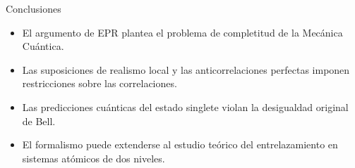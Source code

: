 \begin{frame}{Conclusiones}{}
	\begin{itemize}
		\item El argumento de EPR plantea el problema de completitud de la Mecánica Cuántica.\vspace{3mm}
		\item Las suposiciones de realismo local y las anticorrelaciones perfectas imponen restricciones sobre las correlaciones.\vspace{3mm}
		\item Las predicciones cuánticas del estado singlete violan la desigualdad original de Bell.\vspace{3mm}
		\item El formalismo puede extenderse al estudio teórico del entrelazamiento en sistemas atómicos de dos niveles.
	\end{itemize}
\end{frame}
